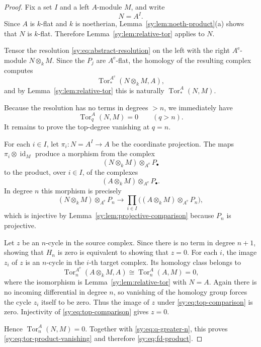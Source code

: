 \documentclass[11pt]{article}
\numberwithin{equation}{section}
\theoremstyle{definition}
\theoremstyle{remark}
\newcommand{\Tor}{\operatorname{Tor}}
\newcommand{\id}{\operatorname{id}}
\begin{document}
\begin{proof}
Fix a set $I$ and a left $A$-module $M$, and write
\[
N=A^I.
\]
Since $A$ is $k$-flat and $k$ is noetherian,
Lemma~\ref{sy:lem:noeth-product}(a) shows that $N$ is $k$-flat.  Therefore
Lemma~\ref{sy:lem:relative-tor} applies to $N$.

Tensor the resolution \eqref{sy:eq:abstract-resolution} on the left with the
right $A^{\mathrm e}$-module $N\otimes_kM$.  Since the $P_j$ are
$A^{\mathrm e}$-flat, the homology of the resulting complex computes
\[
\Tor_*^{A^{\mathrm e}}(N\otimes_kM,A),
\]
and by Lemma~\ref{sy:lem:relative-tor} this is naturally
$\Tor_*^A(N,M)$.

Because the resolution has no terms in degrees $>n$, we immediately have
\begin{equation}
\Tor_q^A(N,M)=0\qquad(q>n).
\label{sy:eq:q-greater-n}
\end{equation}
It remains to prove the top-degree vanishing at $q=n$.

For each $i\in I$, let $\pi_i:N=A^I\to A$ be the coordinate projection.
The maps $\pi_i\otimes\id_M$ produce a morphism from the complex
\[
(N\otimes_kM)\otimes_{A^{\mathrm e}}P_\bullet
\]
to the product, over $i\in I$, of the complexes
\[
(A\otimes_kM)\otimes_{A^{\mathrm e}}P_\bullet.
\]
In degree $n$ this morphism is precisely
\begin{equation}
(N\otimes_kM)\otimes_{A^{\mathrm e}}P_n
\longrightarrow
\prod_{i\in I}
\bigl((A\otimes_kM)\otimes_{A^{\mathrm e}}P_n\bigr),
\label{sy:eq:top-comparison}
\end{equation}
which is injective by Lemma~\ref{sy:lem:projective-comparison} because
$P_n$ is projective.

Let $z$ be an $n$-cycle in the source complex.  Since there is no term in
degree $n+1$, showing that $H_n$ is zero is equivalent to showing that
$z=0$.  For each $i$, the image $z_i$ of $z$ is an $n$-cycle in the
$i$-th target complex.  Its homology class belongs to
\[
\Tor_n^{A^{\mathrm e}}(A\otimes_kM,A)
\cong \Tor_n^A(A,M)=0,
\]
where the isomorphism is Lemma~\ref{sy:lem:relative-tor} with $N=A$.
Again there is no incoming differential in degree $n$, so vanishing of the
homology group forces the cycle $z_i$ itself to be zero.  Thus the image
of $z$ under \eqref{sy:eq:top-comparison} is zero.  Injectivity of
\eqref{sy:eq:top-comparison} gives $z=0$.

Hence $\Tor_n^A(N,M)=0$.  Together with
\eqref{sy:eq:q-greater-n}, this proves \eqref{sy:eq:tor-product-vanishing} and
therefore \eqref{sy:eq:fd-product}.
\end{proof}
\end{document}

